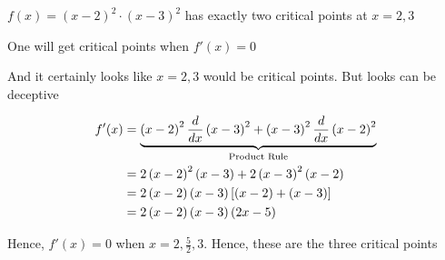 \documentclass[14pt,fleqn]{extarticle}
\newcommand\ea{\left(x-2 \right)}
\newcommand\eb{ \left(x-3 \right)}
\begin{document}
 
\begin{snippet}
    
    \incorrect

     $f(x) = \ea^2\cdot\eb^2$ has exactly two critical points at $x=2,3$   
    
    \reason
    
    One will get critical points when $f'(x) = 0$ \newline 
    
    And it certainly looks like $x=2,3$ would be critical points. But looks can be deceptive 
    
    \begin{align}
	f'(x) &= \underbrace{\ea^2\ddx \eb^2  + \eb^2\ddx \ea^2}_{\text{Product Rule}} \\
	&= 2\ea^2\eb + 2\eb^2\ea\\
	&= 2\ea\eb \left[\ea + \eb \right]\\
	&= 2\ea\eb \left(2x-5 \right)
\end{align}

Hence, $f'(x) = 0$ when $x=2, \frac{5}{2}, 3$. Hence, these are the 
three critical points 
    
\end{snippet} 
\end{document}
